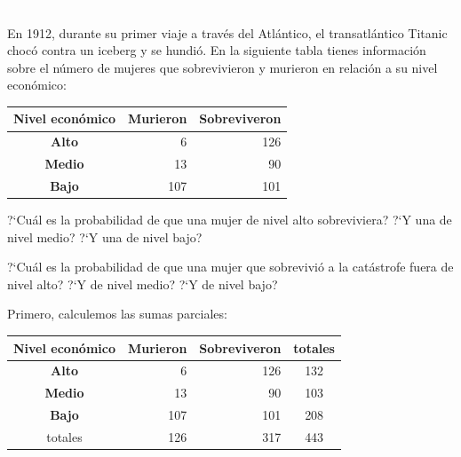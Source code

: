 \vspace{5mm}
\begin{ejemplo}
\begin{ejer}\textcolor{white}{.}

En 1912, durante su primer viaje a través del Atlántico, el transatlántico Titanic chocó contra un iceberg y se hundió. En la siguiente tabla tienes información sobre el número de mujeres que sobrevivieron y murieron en relación a su nivel económico: 


\begin{table}[H]
\centering
\begin{tabular}{|c|r|r|}
\hline
\textbf{Nivel económico} & \multicolumn{1}{c|}{\textbf{Murieron}} & \multicolumn{1}{c|}{\textbf{Sobreviveron}} \\ \hline
\textbf{Alto}            & 6                                      & 126                                        \\ \hline
\textbf{Medio}           & 13                                     & 90                                         \\ \hline
\textbf{Bajo}            & 107                                    & 101                                        \\ \hline
\end{tabular}
\end{table}
 
 ?`Cuál es la probabilidad de que una mujer de nivel alto sobreviviera? ?`Y una de nivel medio? ?`Y una de nivel bajo? 

?`Cuál es la probabilidad de que una mujer que sobrevivió a la catástrofe fuera de nivel alto? ?`Y de nivel medio? ?`Y de nivel bajo? 
	
\end{ejer}
\end{ejemplo}
Primero, calculemos las sumas parciales:

\begin{table}[H]
\centering
\begin{tabular}{c|r|r|c}
\cline{1-3}
\multicolumn{1}{|c|}{\textbf{Nivel económico}} & \multicolumn{1}{c|}{\textbf{Murieron}} & \multicolumn{1}{c|}{\textbf{Sobreviveron}} & totales                 \\ \hline
\multicolumn{1}{|c|}{\textbf{Alto}}            & 6                                      & 126                                        & 132                     \\ \hline
\multicolumn{1}{|c|}{\textbf{Medio}}           & 13                                     & 90                                         & 103                     \\ \hline
\multicolumn{1}{|c|}{\textbf{Bajo}}            & 107                                    & 101                                        & 208                     \\ \hline
totales                                        & 126                                    & 317                                        & \multicolumn{1}{c}{443}
\end{tabular}
\end{table}


